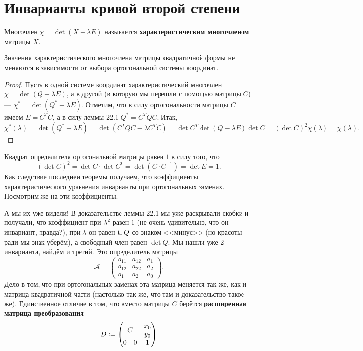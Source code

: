 \section{Инварианты кривой второй степени}

\begin{definition}
    Многочлен $\chi = \det(X - \lambda E)$ называется \textbf{характеристическим многочленом} матрицы $X$.
\end{definition}

\begin{theorem}
    Значения характеристического многочлена матрицы квадратичной формы не меняются в зависимости от выбора ортогональной системы координат.
\end{theorem}

\begin{proof}
    Пусть в одной системе координат характеристический многочлен $\chi = \det(Q - \lambda E)$, а в другой (в которую мы перешли с помощью матрицы $C$) --- $\chi^\ast = \det(Q^\ast - \lambda E)$. Отметим, что в силу ортогональности матрицы $C$ имеем $E = C^TC$, а в силу леммы 22.1 $Q^\ast = C^TQC$. Итак,
    $$
    \chi^\ast(\lambda) = \det(Q^\ast - \lambda E) = \det(C^TQC - \lambda C^TC) = \det C^T\det(Q - \lambda E)\det C = (\det C)^2\chi(\lambda) = \chi(\lambda).
    $$
\end{proof}

\begin{remark}
    Квадрат определителя ортогональной матрицы равен $1$ в силу того, что
    $$
    (\det C)^2 = \det C \cdot \det C^T = \det(C \cdot C^{-1}) = \det E = 1.
    $$
    Как следствие последней теоремы получаем, что коэффициенты характеристического уравнения инварианты при ортогональных заменах. Посмотрим же на эти коэффициенты.
\end{remark}

А мы их уже видели! В доказательстве леммы 22.1 мы уже раскрывали скобки и получали, что коэффициент при $\lambda^2$ равен $1$ (не очень удивительно, что он инвариант, правда?), при $\lambda$ он равен $\mathrm{tr}\, Q$ со знаком <<минус>> (но красоты ради мы знак уберём), а свободный член равен $\det Q$. Мы нашли уже 2 инварианта, найдём и третий. Это определитель матрицы
$$
\mathcal{A} =
\begin{pmatrix}
    a_{11} & a_{12} & a_1\\
    a_{12} & a_{22} & a_2\\
    a_1 & a_2 & a_0
\end{pmatrix}.
$$
Дело в том, что при ортогональных заменах эта матрица меняется так же, как и матрица квадратичной части (настолько так же, что там и доказательство такое же). Единственное отличие в том, что вместо матрицы $C$ берётся \textbf{расширенная матрица преобразования}
$$
D \vcentcolon = 
\begin{pmatrix}
    \multicolumn{2}{c}{\multirow{2}{*}{$C$}} & x_0\\
    \multicolumn{2}{c}{} & y_0\\
    0 & 0 & 1
\end{pmatrix}
$$

